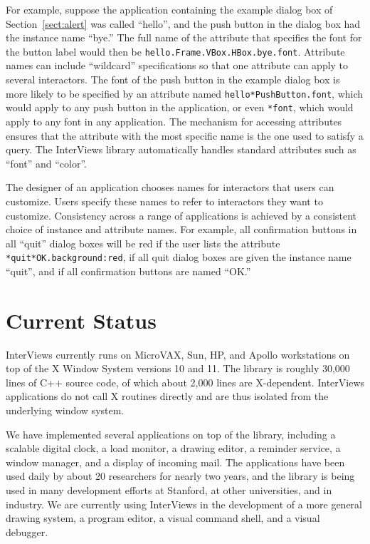 For example, suppose the application containing the example dialog box of
Section~\ref{sect:alert} was called ``hello'', and the push button in
the dialog box had the instance name ``bye.'' The full name
of the attribute that specifies the font for the button label
would then be
\verb#hello.Frame.VBox.HBox.bye.font#.  Attribute names can include
``wildcard'' specifications so that one attribute can apply to
several interactors.  The font of the push button in the
example dialog box is more likely to be specified by an attribute named
\verb#hello*PushButton.font#, which would apply to any push button in
the application, or even \verb#*font#, which would apply to any font
in any application.  The mechanism for accessing attributes ensures
that the attribute with the most specific name is the one used to
satisfy a query.
The InterViews library automatically handles standard attributes
such as ``font'' and ``color''.

The designer of an application chooses names for interactors that
users can customize. Users specify these names to
refer to interactors they want to customize.  Consistency across a
range of applications is achieved by a consistent choice of instance
and attribute names.  For example, all confirmation buttons in all
``quit'' dialog boxes will be red if the user lists the attribute
\verb#*quit*OK.background:red#, if all quit dialog boxes are given the
instance name ``quit'', and if all confirmation buttons are named ``OK.''

\section{Current Status}

InterViews currently runs on MicroVAX, Sun, HP, and Apollo
workstations on top of the X Window System \cite{x} versions 10 and 11.  The
library is roughly 30,000 lines of C++ source code,
of which about 2,000 lines
are X-dependent.  InterViews applications do not call X
routines directly and are thus isolated from
the underlying window system.

We have implemented several applications on top of the library, including
a scalable digital clock, a load monitor, a drawing editor, a reminder
service, a window manager, and a display of incoming mail.  The applications
have been used daily by about 20 researchers for nearly two years, and the
library is being used in many development efforts at Stanford, at other
universities, and in industry.  We are currently using InterViews in the
development of a more general drawing system, a program editor, a
visual command shell, and a visual debugger.


